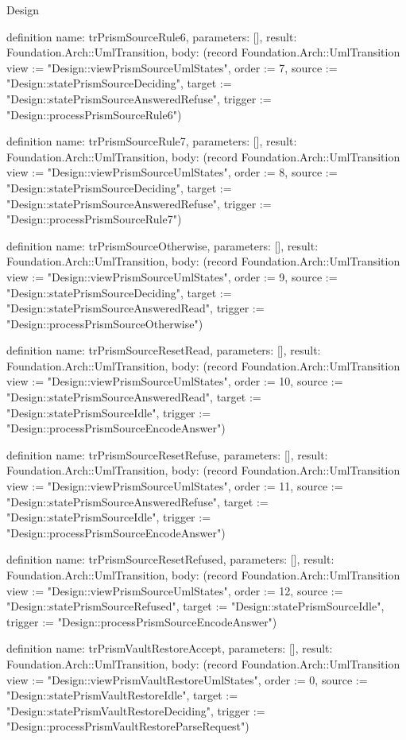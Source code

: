 \begin{lexlean}{Design}
\begin{semanticmodule}
definition{
  name: trPrismSourceRule6,
  parameters: [],
  result: Foundation.Arch::UmlTransition,
  body: (record Foundation.Arch::UmlTransition {view := "Design::viewPrismSourceUmlStates", order := 7, source := "Design::statePrismSourceDeciding", target := "Design::statePrismSourceAnsweredRefuse", trigger := "Design::processPrismSourceRule6"})
}

definition{
  name: trPrismSourceRule7,
  parameters: [],
  result: Foundation.Arch::UmlTransition,
  body: (record Foundation.Arch::UmlTransition {view := "Design::viewPrismSourceUmlStates", order := 8, source := "Design::statePrismSourceDeciding", target := "Design::statePrismSourceAnsweredRefuse", trigger := "Design::processPrismSourceRule7"})
}

definition{
  name: trPrismSourceOtherwise,
  parameters: [],
  result: Foundation.Arch::UmlTransition,
  body: (record Foundation.Arch::UmlTransition {view := "Design::viewPrismSourceUmlStates", order := 9, source := "Design::statePrismSourceDeciding", target := "Design::statePrismSourceAnsweredRead", trigger := "Design::processPrismSourceOtherwise"})
}

definition{
  name: trPrismSourceResetRead,
  parameters: [],
  result: Foundation.Arch::UmlTransition,
  body: (record Foundation.Arch::UmlTransition {view := "Design::viewPrismSourceUmlStates", order := 10, source := "Design::statePrismSourceAnsweredRead", target := "Design::statePrismSourceIdle", trigger := "Design::processPrismSourceEncodeAnswer"})
}

definition{
  name: trPrismSourceResetRefuse,
  parameters: [],
  result: Foundation.Arch::UmlTransition,
  body: (record Foundation.Arch::UmlTransition {view := "Design::viewPrismSourceUmlStates", order := 11, source := "Design::statePrismSourceAnsweredRefuse", target := "Design::statePrismSourceIdle", trigger := "Design::processPrismSourceEncodeAnswer"})
}

definition{
  name: trPrismSourceResetRefused,
  parameters: [],
  result: Foundation.Arch::UmlTransition,
  body: (record Foundation.Arch::UmlTransition {view := "Design::viewPrismSourceUmlStates", order := 12, source := "Design::statePrismSourceRefused", target := "Design::statePrismSourceIdle", trigger := "Design::processPrismSourceEncodeAnswer"})
}

definition{
  name: trPrismVaultRestoreAccept,
  parameters: [],
  result: Foundation.Arch::UmlTransition,
  body: (record Foundation.Arch::UmlTransition {view := "Design::viewPrismVaultRestoreUmlStates", order := 0, source := "Design::statePrismVaultRestoreIdle", target := "Design::statePrismVaultRestoreDeciding", trigger := "Design::processPrismVaultRestoreParseRequest"})
}


\end{semanticmodule}
\end{lexlean}
